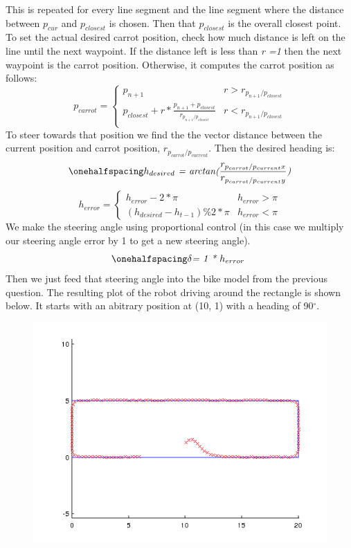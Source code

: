 \documentclass[12pt]{article}
\begin{document}
This is repeated for every line segment and the line segment where the distance between $p_{cur}$ and $p_{closest}$ is chosen. Then that $p_{closest}$ is the overall closest point. To set the actual desired carrot position, check how much distance is left on the line until the next waypoint. If the distance left is less than \textit{r =1} then the next waypoint is the carrot position. Otherwise, it computes the carrot position as follows:
\[ 
      p_{carrot} = 
      \begin{cases} 
      p_{n+1} & r > r_{p_{n+1}/p_{closest}}\\
      p_{closest} + r * \frac{p_{n+1} + p_{closest}}{r_{p_{n+1}/p_{closest}}} & r < r_{p_{n+1}/p_{closest}} \\
   \end{cases}
\]
To steer towards that position we find the the vector distance between the current position and carrot position, \textit{$r_{p_{carrot}/p_{current}}$}. Then the desired heading is:
 \begin{equation}
\onehalfspacing
\centering
\emph{$h_{desired}$ = arctan($\frac{r_{p_{carrot}/p_{current}x}}{r_{p_{carrot}/p_{current}y}}$)}
\end{equation}
\[ 
      h_{error} = 
      \begin{cases} 
      h_{error} - 2*\pi & h_{error} > \pi \\
      (h_{desired} - h_{t-1}) \% 2*\pi & h_{error} < \pi
   \end{cases}
\]
We make the steering angle using proportional control (in this case we multiply our steering angle error by 1 to get a new steering angle).
\begin{equation}
\onehalfspacing
\centering
\emph{$\delta$= 1 * $h_{error}$ }
\end{equation}
Then we just feed that steering angle into the bike model from the previous question.
The resulting plot of the robot driving around the rectangle is shown below. It starts with an abitrary position at (10, 1) with a heading of 90$^\circ$.
\begin{figure}[ht]
\hspace{0.5cm}
\centering
\includegraphics[scale=0.5]{Pictures/carrot.png}
\end{figure}
\end{document}
